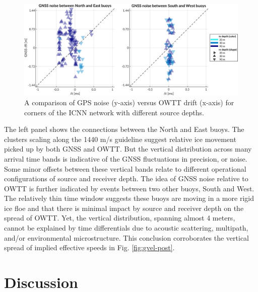 \begin{figure}[h!]
	\centering
	\includegraphics[width=\columnwidth]{figs/gps-drift-example.pdf} 
	\caption{A comparison of GPS noise (y-axis) versus OWTT drift (x-axis) for corners of the ICNN network with different source depths.}
	\label{fig:gps-drift-example}
\end{figure}

The left panel shows the connections between the North and East buoys.
The clusters scaling along the 1440 m/s guideline suggest relative ice movement picked up by both GNSS and OWTT.
But the vertical distribution across many arrival time bands is indicative of the GNSS fluctuations in precision, or noise.
Some minor offsets between these vertical bands relate to different operational configurations of source and receiver depth.
The idea of GNSS noise relative to OWTT is further indicated by events between two other buoys, South and West.
The relatively thin time window suggests these buoys are moving in a more rigid ice floe and that there is minimal impact by source and receiver depth on the spread of OWTT.
Yet, the vertical distribution, spanning almost 4 meters, cannot be explained by time differentials due to acoustic scattering, multipath, and/or environmental microstructure.
This conclusion corroborates the vertical spread of implied effective speeds in Fig. \ref{fig:gvel-post}.

\clearpage
\section{Discussion}

